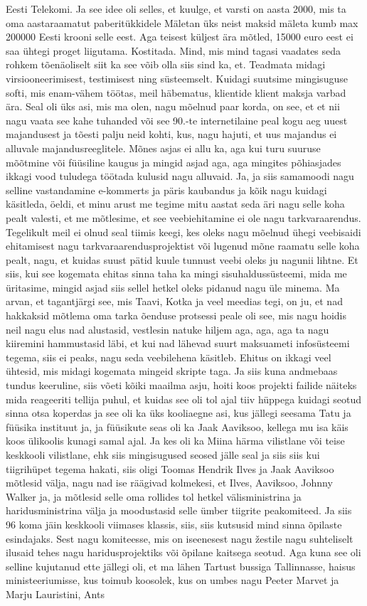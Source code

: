 Eesti Telekomi. Ja see idee oli selles, et kuulge, et varsti on aasta 2000, mis ta oma aastaraamatut paberitükkidele
Mäletan üks neist maksid mäleta kumb max 200000 Eesti krooni selle eest. Aga teisest küljest ära mõtled, 15000 euro eest ei saa ühtegi proget liigutama. Kostitada.
Mind, mis mind tagasi vaadates seda rohkem tõenäoliselt siit ka see võib olla siis sind ka, et.
Teadmata midagi virsiooneerimisest, testimisest ning süsteemselt. Kuidagi suutsime mingisuguse softi, mis enam-vähem töötas, meil häbematus, klientide klient maksja varbad ära. Seal oli üks asi, mis ma olen, nagu mõelnud paar korda, on see, et et nii nagu vaata see kahe tuhanded või see 90.-te internetilaine peal kogu aeg uuest majandusest ja tõesti palju neid kohti, kus, nagu hajuti, et uus majandus ei alluvale majandusreeglitele. Mõnes asjas ei allu ka, aga kui turu suuruse mõõtmine või füüsiline kaugus ja mingid asjad aga, aga mingites põhiasjades ikkagi vood tuludega töötada kulusid nagu alluvaid. Ja, ja siis samamoodi nagu selline vastandamine e-kommerts ja päris kaubandus ja kõik nagu kuidagi käsitleda, öeldi, et minu arust me tegime mitu aastat seda äri nagu selle koha pealt valesti, et me mõtlesime, et see veebiehitamine ei ole nagu tarkvaraarendus. Tegelikult meil ei olnud seal tiimis keegi, kes oleks nagu mõelnud ühegi veebisaidi ehitamisest nagu tarkvaraarendusprojektist või lugenud mõne raamatu selle koha pealt, nagu, et kuidas suust pätid kuule tunnust veebi oleks ju nagunii lihtne. Et siis, kui see kogemata ehitas sinna taha ka mingi sisuhaldussüsteemi, mida me üritasime, mingid asjad siis sellel hetkel oleks pidanud nagu üle minema. Ma arvan, et tagantjärgi see, mis Taavi, Kotka ja veel meedias tegi, on ju, et nad hakkaksid mõtlema oma tarka õenduse protsessi peale oli see, mis nagu hoidis neil nagu elus nad alustasid, vestlesin natuke hiljem aga, aga, aga ta nagu kiiremini hammustasid läbi, et kui nad lähevad suurt maksuameti infosüsteemi tegema, siis ei peaks, nagu seda veebilehena käsitleb. Ehitus on ikkagi veel ühtesid, mis midagi kogemata mingeid skripte taga. Ja siis kuna andmebaas tundus keeruline, siis võeti kõiki maailma asju, hoiti koos projekti failide näiteks mida reageeriti tellija puhul, et kuidas see oli tol ajal tiiv hüppega kuidagi seotud sinna otsa koperdas ja see oli ka üks kooliaegne asi, kus jällegi seesama Tatu ja füüsika instituut ja, ja füüsikute seas oli ka Jaak Aaviksoo, kellega mu isa käis koos ülikoolis kunagi samal ajal. Ja kes oli ka Miina härma vilistlane või teise keskkooli vilistlane, ehk siis mingisugused seosed jälle seal ja siis siis kui tiigrihüpet tegema hakati, siis oligi Toomas Hendrik Ilves ja Jaak Aaviksoo mõtlesid välja, nagu nad ise räägivad kolmekesi, et Ilves, Aaviksoo, Johnny Walker ja, ja mõtlesid selle oma rollides tol hetkel välisministrina ja haridusministrina välja ja moodustasid selle ümber tiigrite peakomiteed. Ja siis 96 koma jäin keskkooli viimases klassis, siis, siis kutsusid mind sinna õpilaste esindajaks. Sest nagu komiteesse, mis on iseenesest nagu žestile nagu suhteliselt ilusaid tehes nagu haridusprojektiks või õpilane kaitsega seotud. Aga kuna see oli selline kujutanud ette jällegi oli, et ma lähen Tartust bussiga Tallinnasse, haisus ministeeriumisse, kus toimub koosolek, kus on umbes nagu Peeter Marvet ja Marju Lauristini, Ants 